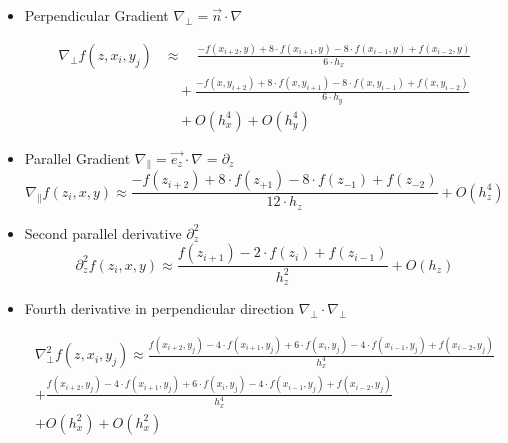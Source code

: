 \documentclass[master.tex]{subfiles}
\begin{document}
\begin{itemize}
    \item Perpendicular Gradient $\nabla_{\perp} = \vec{n}\cdot\nabla$\\
     \begin{small}
        \begin{equation}
        \begin{split}
            \nabla_{\perp} f(z, x_i,y_j) &\approx  \quad\frac{-f(x_{i+2},y) + 8 \cdot f(x_{i + 1}, y) -  8 \cdot f(x_{i - 1}, y) + f(x_{i - 2}, y)}{6 \cdot h_x} \\
            &\quad + \frac{-f(x,y_{i + 2}) + 8 \cdot f(x, y_{i + 1}) -  8 \cdot f(x, y_{i - 1}) + f(x, y_{i - 2})}{6 \cdot h_y}\\
            &\quad + O(h_x^4) + O(h_y^4)
        \end{split}
        \end{equation}
    \end{small}
    \item Parallel Gradient $\nabla_{\parallel} = \vec{e_z}\cdot\nabla = \partial_z$\\
    \begin{equation}
        \nabla_{\parallel} f(z_i,x,y) \approx \frac{-f(z_{i+2}) + 8 \cdot f(z_{+1}) - 8 \cdot f(z_{-1}) + f(z_{-2})}{12 \cdot h_z} + O(h_z^4)
    \end{equation}
    \item Second parallel derivative $\partial_z^2$\\
    \begin{equation}
           \partial_z^2f(z_i,x,y) \approx \frac{f(z_{i+1})-2\cdot f(z_i)+ f(z_{i-1})}{h_z^2} + O(h_z)
    \end{equation}
    \item Fourth derivative in perpendicular direction $\nabla_\perp \cdot \nabla_\perp$\\
    \begin{footnotesize}
    \begin{equation}
    \begin{split}
    \nabla_\perp^2f(z,x_i,y_j) \approx \frac{f(x_{i+2},y_j) - 4 \cdot f(x_{i+1},y_j) +6\cdot f(x_i,y_j) -4 \cdot f(x_{i-1},y_j) + f(x_{i-2}, y_j)}{h_x^4}  \\ + \frac{f(x_{i+2},y_j) - 4 \cdot f(x_{i+1},y_j) +6\cdot f(x_i,y_j) -4 \cdot f(x_{i-1},y_j) + f(x_{i-2}, y_j)}{h_x^4}  \\  + O(h_x^2) + O(h_x^2)
    \end{split}
    \end{equation}

\end{footnotesize}
\end{itemize}
\end{document}
